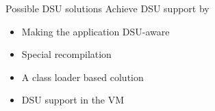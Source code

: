 \begin{frame}{Possible DSU solutions}%
Achieve DSU support by
\begin{itemize}
\item Making the application DSU-aware
\item Special recompilation
\item A class loader based colution 
\item DSU support in the VM
\end{itemize}
\end{frame}

% 



